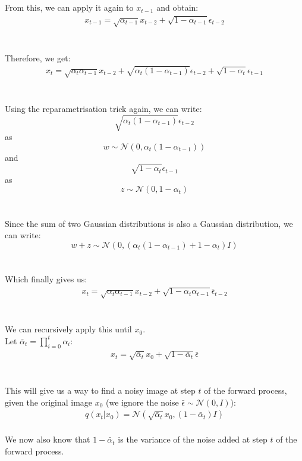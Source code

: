 \documentclass{article}
\begin{document}
\\\\
From this, we can apply it again to $x_{t-1}$ and obtain:
\begin{gather*}
  x_{t-1} = \sqrt{\alpha_{t-1}} x_{t-2} + \sqrt{1 - \alpha_{t-1}} \epsilon_{t - 2}
\end{gather*}
\\\\
Therefore, we get:
\begin{gather*}
  x_t = \sqrt{\alpha_t \alpha_{t-1}} x_{t-2} + \sqrt{\alpha_t(1 - \alpha_{t-1})} \epsilon_{t - 2} + \sqrt{1 - \alpha_t} \epsilon_{t - 1} \label{eq:8}
\end{gather*}
\\\\
Using the reparametrisation trick again, we can write:
$$\sqrt{\alpha_t(1 - \alpha_{t-1})} \epsilon_{t - 2}$$ 
as 
$$w \sim \mathcal{N}(0, \alpha_t(1 - \alpha_{t-1}))$$
and
$$\sqrt{1 - \alpha_t} \epsilon_{t - 1}$$
as
$$z \sim \mathcal{N}(0, 1 - \alpha_t)$$
\\\\
Since the sum of two Gaussian distributions is also a Gaussian distribution, we can write:
$$w + z \sim \mathcal{N}(0, (\alpha_t(1 - \alpha_{t-1}) + 1 - \alpha_t)I)$$
\\\\
Which finally gives us:
\begin{gather*}
  x_t = \sqrt{\alpha_t \alpha_{t-1}} x_{t-2} + \sqrt{1 - \alpha_t \alpha_{t-1}} \bar{\epsilon}_{t - 2}
\end{gather*}
\\\\
We can recursively apply this until $x_0$. \\
Let $\bar{\alpha}_t = \prod_{i=0}^{t}{\alpha_i}$:
\begin{gather}
  x_t = \sqrt{\bar{\alpha}_t} x_0 + \sqrt{1 - \bar{\alpha}_t} \bar{\epsilon} \label{eq:3}
\end{gather}
\\\\
This will give us a way to find a noisy image at step $t$ of the forward process, given the original image $x_0$ (we ignore the noise $\bar{\epsilon} \sim \mathcal{N}(0, I)$):
\begin{gather}
  q(x_t | x_0) = \mathcal{N}(\sqrt{\bar{\alpha}_t} x_0, (1 - \bar{\alpha}_t)I) \label{eq:4}
\end{gather}
\\
We now also know that $1 - \bar{\alpha}_t$ is the variance of the noise added at step $t$ of the forward process. \cite{nichol2021improved}
\end{document}
